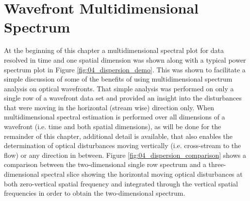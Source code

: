 \section{Wavefront Multidimensional Spectrum}
At the beginning of this chapter a multidimensional spectral plot for data resolved in time and one spatial dimension was shown along with a typical power spectrum plot in Figure \ref{fig:04_dispersion_demo}.
This was shown to facilitate a simple discussion of some of the benefits of using multidimensional spectrum analysis on optical wavefronts.
That simple analysis was performed on only a single row of a wavefront data set and provided an insight into the disturbances that were moving in the horizontal (stream wise) direction only.
When multidimensional spectral estimation is performed over all dimensions of a wavefront (i.e. time and both spatial dimensions), as will be done for the remainder of this chapter, additional detail is available, that also enables the determination of optical disturbances moving vertically (i.e. cross-stream to the flow) or any direction in between.
Figure \ref{fig:04_dispersion_comparison} shows a comparison between the two-dimensional single row spectrum and a three-dimensional spectral slice showing the horizontal moving optical disturbances at both zero-vertical spatial frequency and integrated through the vertical spatial frequencies in order to obtain the two-dimensional spectrum.
